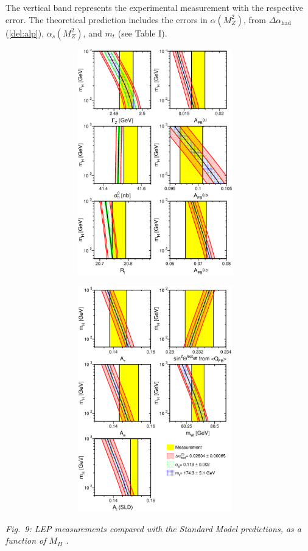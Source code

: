 \documentclass[12pt]{report}
\def\text#1{{\scriptstyle\mathrm{#1}}}
\begin{document}
The vertical band represents the experimental measurement with the
respective error. The theoretical prediction includes the errors in 
$\alpha(M_Z^2)$, from $\Delta\alpha_{\text{had}}$ (\ref{del:alp}), 
$\alpha_s(M_Z^2)$, and $m_t$ (see Table I). 

\newpage
\null
\vspace{-2cm}
\includegraphics[width=13cm,height=9.8cm]{fig09a.eps}

\vspace{-0.5cm}
\hspace{1.8pt}
\includegraphics[width=13cm,height=9.8cm]{fig09b.eps}
\begin{center}
\begin{minipage}[h]{12cm}
\begin{center}
{\it Fig.\ 9: LEP measurements compared with the Standard Model
predictions, as a function of $M_H$ \cite{LepSite}.}
\end{center}
\end{minipage}
\end{center}
\end{document}
